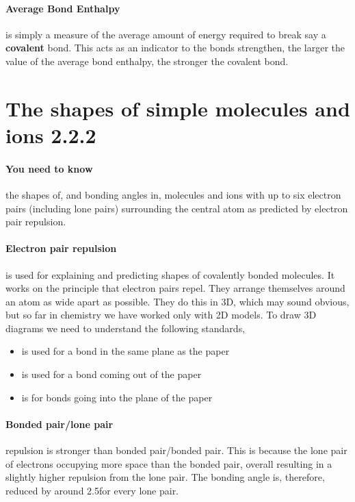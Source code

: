 	\paragraph{Average Bond Enthalpy} is simply a measure of the average amount of energy required to break say a  \textbf{covalent} bond.
	This acts as an indicator to the bonds strengthen, the larger the value of the average bond enthalpy, the stronger the covalent bond.
    \section{The shapes of simple molecules and ions 2.2.2}
	
	\paragraph{You need to know} the shapes of, and bonding angles in, molecules and ions with up to six electron pairs (including lone pairs) surrounding the central atom as predicted by electron pair repulsion.
	
	\paragraph{Electron pair repulsion} is used for explaining and predicting shapes of covalently bonded molecules.
	It works on the principle that electron pairs repel. They arrange themselves around an atom as wide apart as possible.
	They do this in 3D, which may sound obvious, but so far in chemistry we have worked only with 2D models.
	To draw 3D diagrams we need to understand the following standards,
	\begin{itemize}
		\item {} is used for a bond in the same plane as the paper
		\item {} is used for a bond coming out of the paper
		\item {} is for bonds going into the plane of the paper
	\end{itemize}
    \paragraph{Bonded pair/lone pair} repulsion is stronger than bonded pair/bonded pair.
	This is because the lone pair of electrons occupying more space than the bonded pair, overall resulting in a slightly higher repulsion from the lone pair.
	The bonding angle is, therefore, reduced by around 2.5\degree for every lone pair.
	
